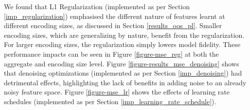 \documentclass[a4paper,11pt,oneside]{article}
\theoremstyle{plain}
\theoremstyle{definition}
\begin{document}
	We found that L1 Regularization (implemented as per Section \ref{imp_regularization}) emphasised the different nature of features learnt at different encoding sizes, as discussed in Section \ref{results_oos_pl}. Smaller encoding sizes, which are generalizing by nature, benefit from the regularization. For larger encoding sizes, the regularization simply lowers model fidelity. These performance impacts can be seen in Figure \ref{figure-mse_reg} at both the aggregate and encoding size level. Figure \ref{figure-results_mse_denoising} shows that denoising optimizations (implemented as per Section \ref{imp_denoising}) had detrimental effects, highlighting the lack of benefits in adding noise to an already noisy feature space. Figure \ref{figure-mse_lr} shows the effects of learning rate schedules (implemented as per Section \ref{imp_learning_rate_schedule}).
	
\end{document}
